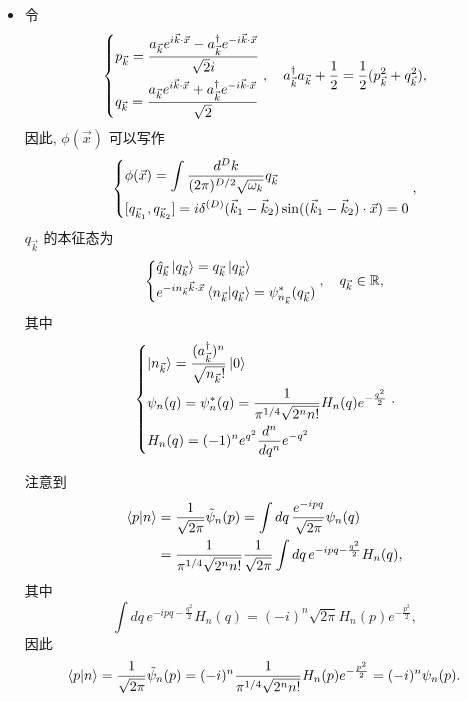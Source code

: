 \documentclass[10pt, a4paper]{article}
\numberwithin{equation}{section}
\begin{document}
\begin{itemize}
		\item 令
		\begin{equation}
			\begin{dcases}
				p_{\vec{k}} = \frac{a_{\vec{k}} e^{i \vec{k} \cdot \vec{x}} - a^\dag_{\vec{k}} e^{- i \vec{k} \cdot \vec{x}}}{\sqrt{2} i} \\
				q_{\vec{k}} = \frac{a_{\vec{k}} e^{i \vec{k} \cdot \vec{x}} + a^\dag_{\vec{k}} e^{- i \vec{k} \cdot \vec{x}}}{\sqrt{2}}
			\end{dcases}, \quad a^\dag_{\vec{k}} a_{\vec{k}} + \frac{1}{2} = \frac{1}{2} (p_{\vec{k}}^2 + q_{\vec{k}}^2),
		\end{equation}
		因此, $\phi(\vec{x})$ 可以写作
		\begin{equation}
			\begin{dcases}
				\phi(\vec{x}) = \int \frac{d^D k}{(2 \pi)^{D / 2} \sqrt{\omega_k}} q_{\vec{k}} \\
				[q_{\vec{k}_1}, q_{\vec{k}_2}] = i \delta^{(D)}(\vec{k}_1 - \vec{k}_2) \sin((\vec{k}_1 - \vec{k}_2) \cdot \vec{x}) = 0
			\end{dcases},
		\end{equation}
		$q_{\vec{k}}$ 的本征态为
		\begin{equation}
			\begin{dcases}
				\hat{q}_{\vec{k}} \ket{q_{\vec{k}}} = q_{\vec{k}} \ket{q_{\vec{k}}} \\
				e^{- i n_{\vec{k}} \vec{k} \cdot \vec{x}} \braket{n_{\vec{k}} | q_{\vec{k}}} = \psi^*_{n_{\vec{k}}}(q_{\vec{k}})
			\end{dcases}, \quad q_{\vec{k}} \in \mathbb{R},
		\end{equation}
		其中
		\begin{equation}
			\begin{dcases}
				\ket{n_{\vec{k}}} = \frac{(a^\dag_{\vec{k}})^n}{\sqrt{n_{\vec{k}}!}} \ket{0} \\
				\psi_n(q) = \psi^*_n(q) = \frac{1}{\pi^{1 / 4} \sqrt{2^n n!}} H_n(q) e^{- \frac{q^2}{2}} \\
				H_n(q) = (- 1)^n e^{q^2} \frac{d^n}{dq^n} e^{- q^2}
			\end{dcases}.
		\end{equation}
		
		\begin{tcolorbox}[title=remark:]
			注意到
			\begin{align}
				\braket{p | n} &= \frac{1}{\sqrt{2 \pi}} \tilde{\psi}_n(p) = \int dq \, \frac{e^{- i p q}}{\sqrt{2 \pi}} \psi_n(q) \notag \\
				&= \frac{1}{\pi^{1 / 4} \sqrt{2^n n!}} \frac{1}{\sqrt{2 \pi}} \int dq \, e^{- i p q - \frac{q^2}{2}} H_n(q), 
			\end{align}
			其中
			\begin{equation} \label{B.7}
				\int dq \, e^{- i p q - \frac{q^2}{2}} H_n(q) = (- i)^n \sqrt{2 \pi} H_n(p) e^{- \frac{p^2}{2}},
			\end{equation}
			因此
			\begin{equation}
				\braket{p | n} = \frac{1}{\sqrt{2 \pi}} \tilde{\psi}_n(p) = (- i)^n \frac{1}{\pi^{1 / 4} \sqrt{2^n n!}} H_n(p) e^{- \frac{p^2}{2}} = (- i)^n \psi_n(p).
			\end{equation}
			

\end{tcolorbox}
\end{itemize}
\end{document}
